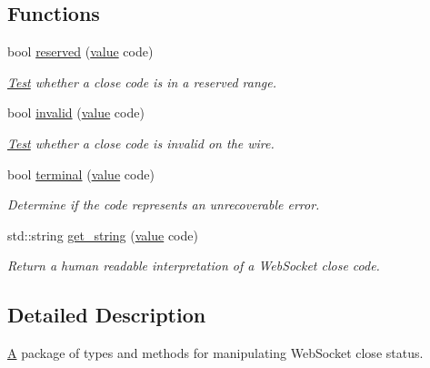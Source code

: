 \subsection*{Functions}
\begin{DoxyCompactItemize}
\item 
bool \mbox{\hyperlink{namespacewebsocketpp_1_1close_1_1status_af26a61f8a8c3247cf656349f96ea3008}{reserved}} (\mbox{\hyperlink{namespacewebsocketpp_1_1close_1_1status_a8614a5c4733d708e2d2a32191c5bef84}{value}} code)
\begin{DoxyCompactList}\small\item\em \mbox{\hyperlink{struct_test}{Test}} whether a close code is in a reserved range. \end{DoxyCompactList}\item 
bool \mbox{\hyperlink{namespacewebsocketpp_1_1close_1_1status_ad024f852889be28eadcec8209fdf9bc8}{invalid}} (\mbox{\hyperlink{namespacewebsocketpp_1_1close_1_1status_a8614a5c4733d708e2d2a32191c5bef84}{value}} code)
\begin{DoxyCompactList}\small\item\em \mbox{\hyperlink{struct_test}{Test}} whether a close code is invalid on the wire. \end{DoxyCompactList}\item 
bool \mbox{\hyperlink{namespacewebsocketpp_1_1close_1_1status_a3f9ce953f12693f74493e2eb7a80952b}{terminal}} (\mbox{\hyperlink{namespacewebsocketpp_1_1close_1_1status_a8614a5c4733d708e2d2a32191c5bef84}{value}} code)
\begin{DoxyCompactList}\small\item\em Determine if the code represents an unrecoverable error. \end{DoxyCompactList}\item 
std\+::string \mbox{\hyperlink{namespacewebsocketpp_1_1close_1_1status_a4bf4987c79165b134ed1207a567ce209}{get\+\_\+string}} (\mbox{\hyperlink{namespacewebsocketpp_1_1close_1_1status_a8614a5c4733d708e2d2a32191c5bef84}{value}} code)
\begin{DoxyCompactList}\small\item\em Return a human readable interpretation of a Web\+Socket close code. \end{DoxyCompactList}\end{DoxyCompactItemize}


\subsection{Detailed Description}
\mbox{\hyperlink{struct_a}{A}} package of types and methods for manipulating Web\+Socket close status\textquotesingle{}. 

